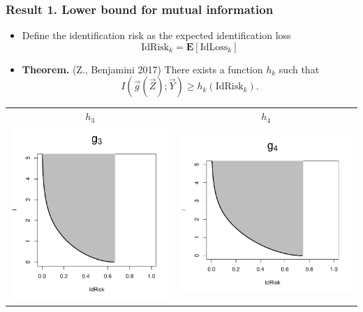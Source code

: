 \documentclass{beamer}
\newcommand{\E}{\textbf{E}}
\begin{document}
\begin{frame}
\frametitle{Result 1. Lower bound for mutual information}
\begin{itemize}
\item Define the identification risk as the expected identification loss
\[
\text{IdRisk}_k = \E[\text{IdLoss}_k]
\]
\item \textbf{Theorem.} (Z., Benjamini 2017) There exists a function $h_k$ such that
\[I(\vec{g}(\vec{Z}); \vec{Y}) \geq h_k(\text{IdRisk}_k).\]
\end{itemize}
\begin{center}
\begin{tabular}{cc}
$h_3$ & $h_4$\\
\includegraphics[scale = 0.4, clip=true, trim=0 0 0 0.55in]{../idloss/g3.pdf} &
\includegraphics[scale = 0.4, clip=true, trim=0 0 0 0.55in]{../idloss/g4.pdf}

\end{tabular}
\end{center}
\end{frame}
\end{document}
